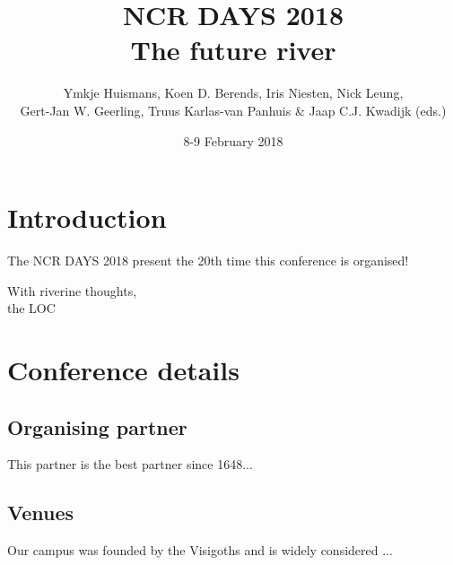 \documentclass[oneside]{ncr_bundle}
\begin{document}

\author{Ymkje Huismans, Koen D. Berends, Iris Niesten, Nick Leung, \\ 
        Gert-Jan W. Geerling, Truus Karlas-van Panhuis \& Jaap C.J. Kwadijk (eds.)}

\title{NCR DAYS 2018 \\ \large{The future river} }
\date{8-9 February 2018}

\ncrtitle
\tableofcontents
       
\chapter{Introduction}
The NCR DAYS 2018 present the 20th time this conference is organised!
\blindtext

With riverine thoughts,\\
the LOC
\chapter{Conference details}
	\section{Organising partner}
	This partner is the best partner since 1648...
	\blindtext
	\section{Venues}
	Our campus was founded by the Visigoths and is widely considered ...
	\blindtext
\end{document}
